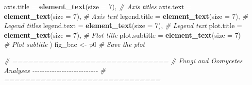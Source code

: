 \documentclass[
  11pt,
]{article}
\newenvironment{Shaded}{\begin{snugshade}}{\end{snugshade}}
\newcommand{\AttributeTok}[1]{\textcolor[rgb]{0.13,0.29,0.53}{#1}}
\newcommand{\CommentTok}[1]{\textcolor[rgb]{0.56,0.35,0.01}{\textit{#1}}}
\newcommand{\DecValTok}[1]{\textcolor[rgb]{0.00,0.00,0.81}{#1}}
\newcommand{\FunctionTok}[1]{\textcolor[rgb]{0.13,0.29,0.53}{\textbf{#1}}}
\newcommand{\NormalTok}[1]{#1}
\newcommand{\OtherTok}[1]{\textcolor[rgb]{0.56,0.35,0.01}{#1}}
\begin{document}
\begin{Shaded}
\begin{Highlighting}[]
    \AttributeTok{axis.title =} \FunctionTok{element\_text}\NormalTok{(}\AttributeTok{size =} \DecValTok{7}\NormalTok{),       }\CommentTok{\# Axis titles}
    \AttributeTok{axis.text =} \FunctionTok{element\_text}\NormalTok{(}\AttributeTok{size =} \DecValTok{7}\NormalTok{),        }\CommentTok{\# Axis text}
    \AttributeTok{legend.title =} \FunctionTok{element\_text}\NormalTok{(}\AttributeTok{size =} \DecValTok{7}\NormalTok{),     }\CommentTok{\# Legend titles}
    \AttributeTok{legend.text =} \FunctionTok{element\_text}\NormalTok{(}\AttributeTok{size =} \DecValTok{7}\NormalTok{),      }\CommentTok{\# Legend text}
    \AttributeTok{plot.title =} \FunctionTok{element\_text}\NormalTok{(}\AttributeTok{size =} \DecValTok{7}\NormalTok{),       }\CommentTok{\# Plot title}
    \AttributeTok{plot.subtitle =} \FunctionTok{element\_text}\NormalTok{(}\AttributeTok{size =} \DecValTok{7}\NormalTok{)     }\CommentTok{\# Plot subtitle}
\NormalTok{  )}
\NormalTok{fig\_bac }\OtherTok{\textless{}{-}}\NormalTok{ p0  }\CommentTok{\# Save the plot}

\CommentTok{\# ==============================}
\CommentTok{\# Fungi and Oomycetes Analyses {-}{-}{-}{-}{-}{-}{-}{-}{-}{-}{-}{-}{-}{-}{-}{-}{-}{-}{-}{-}{-}{-}{-}{-}{-}{-}{-}}
\CommentTok{\# ==============================}


\end{Highlighting}
\end{Shaded}
\end{document}
